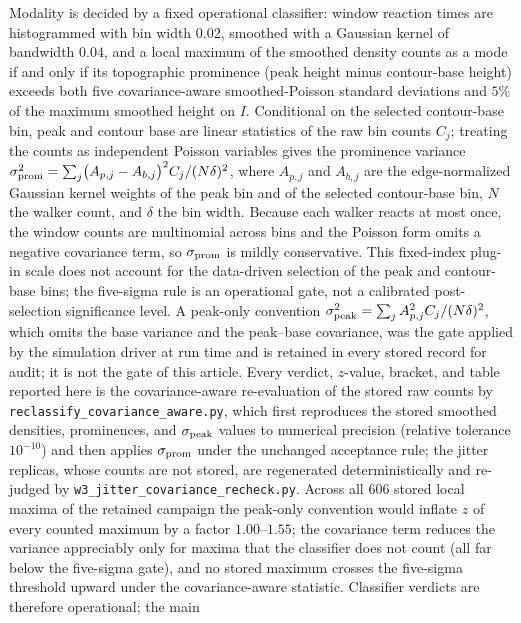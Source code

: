 \documentclass[aps,physrev,onecolumn,amsmath,amssymb,longbibliography]{revtex4-2}
\begin{document}
Modality is decided by a fixed operational classifier: window reaction times
are histogrammed with bin width \(0.02\), smoothed with a Gaussian kernel
of bandwidth \(0.04\), and a local maximum of the smoothed density counts
as a mode if and only if its topographic prominence (peak height minus
contour-base height) exceeds both five covariance-aware smoothed-Poisson
standard deviations and \(5\%\) of the maximum smoothed
height on \(I\).  Conditional on the selected contour-base bin, peak and
contour base are linear statistics of the raw bin counts \(C_j\); treating
the counts as independent Poisson variables gives the prominence variance
\(\sigma_{\rm prom}^2=\sum_j\bigl(A_{p,j}-A_{b,j}\bigr)^2C_j/(N\delta)^2\),
where \(A_{p,j}\) and \(A_{b,j}\) are the edge-normalized Gaussian kernel
weights of the peak bin and of the selected contour-base bin, \(N\) the
walker count, and \(\delta\) the bin width.  Because each walker reacts at
most once, the window counts are multinomial across bins and the Poisson
form omits a negative covariance term, so \(\sigma_{\rm prom}\) is mildly
conservative.  This fixed-index plug-in scale does not account for the
data-driven selection of the peak and contour-base bins; the five-sigma
rule is an operational gate, not a calibrated post-selection significance
level.  A peak-only convention
\(\sigma_{\rm peak}^2=\sum_j A_{p,j}^2C_j/(N\delta)^2\), which omits the
base variance and the peak--base covariance, was the gate applied by the
simulation driver at run time and is retained in every stored record for
audit; it is not the gate of this article.  Every verdict, \(z\)-value,
bracket, and table reported here is the covariance-aware re-evaluation of
the stored raw counts by \texttt{reclassify\_covariance\_aware.py}, which
first reproduces the stored smoothed densities, prominences, and
\(\sigma_{\rm peak}\) values to numerical precision (relative tolerance
\(10^{-10}\)) and then applies \(\sigma_{\rm prom}\) under the unchanged
acceptance rule; the jitter replicas, whose counts are not stored, are
regenerated deterministically and re-judged by
\texttt{w3\_jitter\_covariance\_recheck.py}.  Across all 606 stored local
maxima of the retained campaign the peak-only convention would inflate
\(z\) of every counted maximum by a factor \(1.00\)--\(1.55\); the
covariance term reduces the variance appreciably only for maxima that the
classifier does not count (all far below the five-sigma gate), and no
stored maximum crosses the five-sigma threshold upward under the
covariance-aware statistic.  Classifier verdicts are
therefore operational; the main
\end{document}
